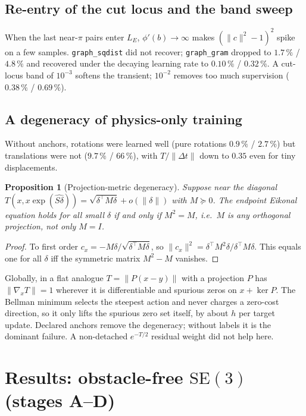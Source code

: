 \documentclass[11pt]{article}
\newtheorem{proposition}{Proposition}
\newcommand{\SE}{\mathrm{SE}(3)}
\newcommand{\code}[1]{\texttt{#1}}
\newcommand{\pct}{\,\%}
\begin{document}
\subsection{Re-entry of the cut locus and the band sweep}

When the last near-$\pi$ pairs enter $L_E$, $\phi'(b)\to\infty$ makes $(\|c\|^2-1)^2$ spike on a few
samples. \code{graph\_sqdist} did not recover; \code{graph\_gram} dropped to $1.7\pct$ / $4.8\pct$ and
recovered under the decaying learning rate to $0.10\pct$ / $0.32\pct$. A cut-locus band of $10^{-3}$
softens the transient; $10^{-2}$ removes too much supervision ($0.38\pct$ / $0.69\pct$).

\subsection{A degeneracy of physics-only training}

Without anchors, rotations were learned well (pure rotations $0.9\pct$ / $2.7\pct$) but translations
were not ($9.7\pct$ / $66\pct$), with $T/\|\Delta t\|$ down to $0.35$ even for tiny displacements.

\begin{proposition}[Projection-metric degeneracy]\label{prop:degenerate}
Suppose near the diagonal $T(x,x\exp(\widehat{S\delta}))=\sqrt{\delta^\top M\delta}+o(\|\delta\|)$ with
$M\succeq0$. The endpoint Eikonal equation holds for all small $\delta$ if and only if $M^2=M$, i.e.\
$M$ is any orthogonal projection, not only $M=I$.
\end{proposition}
\begin{proof}
To first order $c_x=-M\delta/\sqrt{\delta^\top M\delta}$, so
$\|c_x\|^2=\delta^\top M^2\delta/\delta^\top M\delta$. This equals one for all $\delta$ iff the
symmetric matrix $M^2-M$ vanishes.
\end{proof}

Globally, in a flat analogue $T=\|P(x-y)\|$ with a projection $P$ has $\|\nabla_xT\|=1$ wherever it
is differentiable and spurious zeros on $x+\ker P$. The Bellman minimum selects the steepest action
and never charges a zero-cost direction, so it only lifts the spurious zero set itself, by about $h$
per target update. Declared anchors remove the degeneracy; without labels it is the dominant failure.
A non-detached $e^{-T/2}$ residual weight did not help here.

\section{Results: obstacle-free \texorpdfstring{$\SE$}{SE(3)} (stages A--D)}
\label{sec:results}
\end{document}
